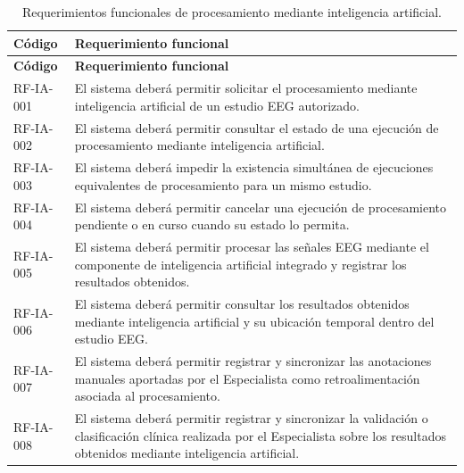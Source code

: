 \begin{longtable}{|p{}|p{}|}
    \caption{Requerimientos funcionales de procesamiento mediante inteligencia artificial.}
    \label{tab:rf-ia}\\
    \hline
    \textbf{Código} & \textbf{Requerimiento funcional} \\
    \hline
    \endfirsthead

    \hline
    \textbf{Código} & \textbf{Requerimiento funcional} \\
    \hline
    \endhead

    RF-IA-001 &
    El sistema deberá permitir solicitar el procesamiento mediante inteligencia
    artificial de un estudio EEG autorizado. \\
    \hline

    RF-IA-002 &
    El sistema deberá permitir consultar el estado de una ejecución de
    procesamiento mediante inteligencia artificial. \\
    \hline

    RF-IA-003 &
    El sistema deberá impedir la existencia simultánea de ejecuciones
    equivalentes de procesamiento para un mismo estudio. \\
    \hline

    RF-IA-004 &
    El sistema deberá permitir cancelar una ejecución de procesamiento
    pendiente o en curso cuando su estado lo permita. \\
    \hline

    RF-IA-005 &
    El sistema deberá permitir procesar las señales EEG mediante el componente
    de inteligencia artificial integrado y registrar los resultados obtenidos. \\
    \hline

    RF-IA-006 &
    El sistema deberá permitir consultar los resultados obtenidos mediante
    inteligencia artificial y su ubicación temporal dentro del estudio EEG. \\
    \hline

    RF-IA-007 &
    El sistema deberá permitir registrar y sincronizar las anotaciones manuales
    aportadas por el Especialista como retroalimentación asociada al
    procesamiento. \\
    \hline

    RF-IA-008 &
    El sistema deberá permitir registrar y sincronizar la validación o
    clasificación clínica realizada por el Especialista sobre los resultados
    obtenidos mediante inteligencia artificial. \\
    \hline
\end{longtable}


